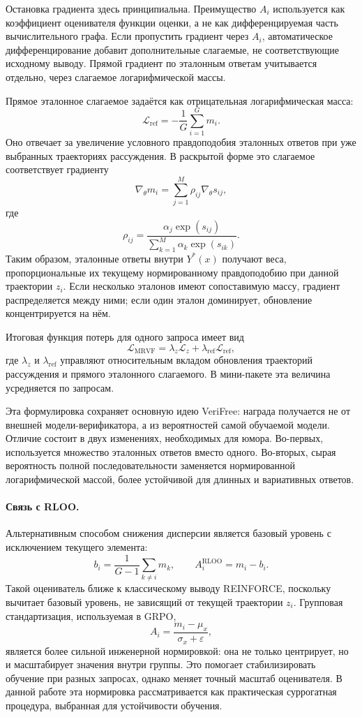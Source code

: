 Остановка градиента здесь принципиальна. Преимущество \(A_i\) используется как коэффициент оценивателя функции оценки, а не как дифференцируемая часть вычислительного графа. Если пропустить градиент через \(A_i\), автоматическое дифференцирование добавит дополнительные слагаемые, не соответствующие исходному выводу. Прямой градиент по эталонным ответам учитывается отдельно, через слагаемое логарифмической массы.

Прямое эталонное слагаемое задаётся как отрицательная логарифмическая масса:
\[
    \mathcal{L}_{\mathrm{ref}}
    =
    -
    \frac{1}{G}
    \sum_{i=1}^{G}
    m_i.
\]
Оно отвечает за увеличение условного правдоподобия эталонных ответов при уже выбранных траекториях рассуждения. В раскрытой форме это слагаемое соответствует градиенту
\[
    \nabla_{\theta}m_i
    =
    \sum_{j=1}^{M}
    \rho_{ij}
    \nabla_{\theta}s_{ij},
\]
где
\[
    \rho_{ij}
    =
    \frac{
        \alpha_j\exp(s_{ij})
    }{
        \sum_{k=1}^{M}
        \alpha_k\exp(s_{ik})
    }.
\]
Таким образом, эталонные ответы внутри \(Y^{*}(x)\) получают веса, пропорциональные их текущему нормированному правдоподобию при данной траектории \(z_i\). Если несколько эталонов имеют сопоставимую массу, градиент распределяется между ними; если один эталон доминирует, обновление концентрируется на нём.

Итоговая функция потерь для одного запроса имеет вид
\[
    \mathcal{L}_{\mathrm{MRVF}}
    =
    \lambda_z
    \mathcal{L}_{z}
    +
    \lambda_{\mathrm{ref}}
    \mathcal{L}_{\mathrm{ref}},
\]
где \(\lambda_z\) и \(\lambda_{\mathrm{ref}}\) управляют относительным вкладом обновления траекторий рассуждения и прямого эталонного слагаемого. В мини-пакете эта величина усредняется по запросам.

Эта формулировка сохраняет основную идею VeriFree: награда получается не от внешней модели-верификатора, а из вероятностей самой обучаемой модели. Отличие состоит в двух изменениях, необходимых для юмора. Во-первых, используется множество эталонных ответов вместо одного. Во-вторых, сырая вероятность полной последовательности заменяется нормированной логарифмической массой, более устойчивой для длинных и вариативных ответов.

\paragraph{Связь с RLOO.}
Альтернативным способом снижения дисперсии является базовый уровень с исключением текущего элемента:
\[
    b_i
    =
    \frac{1}{G-1}
    \sum_{k\ne i}
    m_k,
    \qquad
    A_i^{\mathrm{RLOO}}
    =
    m_i-b_i.
\]
Такой оцениватель ближе к классическому выводу REINFORCE, поскольку вычитает базовый уровень, не зависящий от текущей траектории \(z_i\). Групповая стандартизация, используемая в GRPO,
\[
    A_i
    =
    \frac{m_i-\mu_x}{\sigma_x+\varepsilon},
\]
является более сильной инженерной нормировкой: она не только центрирует, но и масштабирует значения внутри группы. Это помогает стабилизировать обучение при разных запросах, однако меняет точный масштаб оценивателя. В данной работе эта нормировка рассматривается как практическая суррогатная процедура, выбранная для устойчивости обучения.


